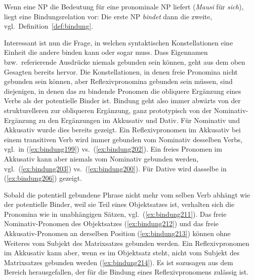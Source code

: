\begin{exe}
\end{exe}

Wenn eine NP die Bedeutung für eine pronominale NP liefert (\zB \textit{Mausi} für \textit{sich}), liegt eine Bindungsrelation vor:
Die erste NP \textit{bindet} dann die zweite, vgl.\ Definition~\ref{def:bindung}.



Interessant ist nun die Frage, in welchen syntaktischen Konstellationen eine Einheit die andere binden kann oder sogar muss.
Dass Eigennamen bzw.\ referierende Ausdrücke niemals gebunden sein können, geht aus dem oben Gesagten bereits hervor.
Die Konstellationen, in denen freie Pronomina nicht gebunden sein können, aber Reflexivpronomina gebunden sein müssen, sind diejenigen, in denen das zu bindende Pronomen die obliquere Ergänzung eines Verbs als der potentielle Binder ist.
Bindung geht also immer abwärts von der strukturelleren zur obliqueren Ergänzung, ganz prototypisch von der Nominativ-Ergänzung zu den Ergänzungen im Akkusativ und Dativ.
Für Nominativ und Akkusativ wurde dies bereits gezeigt.
Ein Reflexivpronomen im Akkusativ bei einem transitiven Verb wird immer gebunden vom Nominativ desselben Verbs, vgl.\ in (\ref{ex:bindung199}) vs.\ (\ref{ex:bindung202}).
Ein freies Pronomen im Akkusativ kann aber niemals vom Nominativ gebunden werden, vgl.\ (\ref{ex:bindung203}) vs.\ (\ref{ex:bindung200}).
Für Dative wird dasselbe in (\ref{ex:bindung206}) gezeigt.

\begin{exe}
  \ex\label{ex:bindung206}
  \begin{xlist}
  \end{xlist}
\end{exe}

Sobald die potentiell gebundene Phrase nicht mehr vom selben Verb abhängt wie der potentielle Binder, weil sie \zB Teil eines Objektsatzes ist, verhalten sich die Pronomina wie in unabhängigen Sätzen, vgl.\ (\ref{ex:bindung211}).
Das freie Nominativ-Pronomen des Objektsatzes (\ref{ex:bindung212}) und das freie Akkusativ-Pronomen an derselben Position (\ref{ex:bindung213}) können ohne Weiteres vom Subjekt des Matrixsatzes gebunden werden.
Ein Reflexivpronomen im Akkusativ kann aber, wenn es im Objektsatz steht, nicht vom Subjekt des Matrixsatzes gebunden werden (\ref{ex:bindung214}).
Es ist sozusagen aus dem Bereich herausgefallen, der für die Bindung eines Reflexivpronomens zulässig ist.


